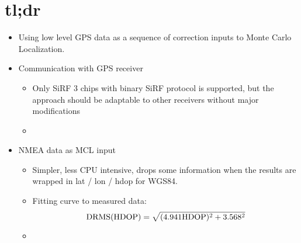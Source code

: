 \chapter{tl;dr}

\begin{itemize}
\item
Using low level GPS data as a sequence of correction inputs to Monte Carlo Localization.

\item
Communication with GPS receiver
\begin{itemize}
    \item Only SiRF 3 chips with binary SiRF protocol is supported, but the
    approach should be adaptable to other receivers without major modifications
    \item {}
\end{itemize}

\item
NMEA data as MCL input
\begin{itemize}
    \item Simpler, less CPU intensive, drops some information when the results are
    wrapped in lat / lon / hdop for WGS84.
    \item
        Fitting curve to measured data:
        \begin{equation*}
            \mathrm{DRMS}(\mathrm{HDOP}) = \sqrt{(\num{4.941}\mathrm{HDOP})^2 + \num{3.568}^2}
        \end{equation*}
    \item {}
\end{itemize}

\end{itemize}
